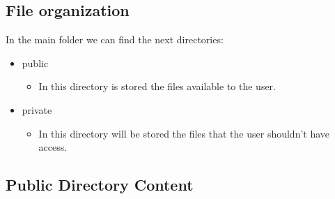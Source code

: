 \subsection{File organization}\label{subsec:file-organization}
\begin{flushleft}
    In the main folder we can find the next directories:
        \begin{itemize}
            \item public
            \begin{itemize}
                \item In this directory is stored the files available to the user.
            \end{itemize}
            \item private
            \begin{itemize}
                \item In this directory will be stored the files that the user shouldn't have access.
            \end{itemize}
        \end{itemize}
\end{flushleft}

\newpage
\subsection{Public Directory Content}\label{subsec:public-directory-content}

